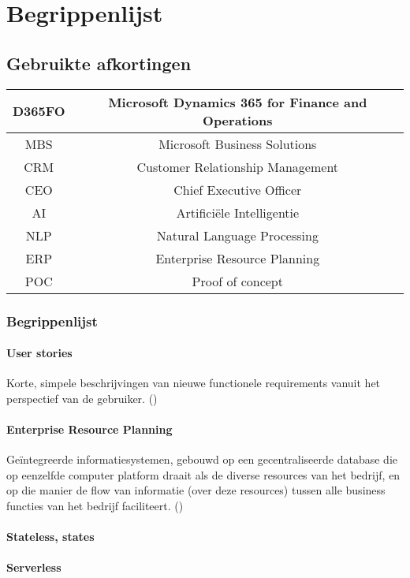 \chapter{Begrippenlijst}
\label{ch:begrippenlijst}

\section{Gebruikte afkortingen}
\begin{tabular}{|c|c|}
    \hline 
    D365FO &  Microsoft Dynamics 365 for Finance and Operations \\
    \hline 
    MBS & Microsoft Business Solutions \\
    \hline
    CRM & Customer Relationship Management  \\
    \hline
    CEO & Chief Executive Officer \\
    \hline
    AI & Artificiële Intelligentie \\
    \hline
    NLP & Natural Language Processing \\
    \hline
    ERP & Enterprise Resource Planning \\
    \hline
    POC & Proof of concept \\
    \hline 
\end{tabular} 

\subsection{Begrippenlijst}
\subsubsection{User stories}
Korte, simpele beschrijvingen van nieuwe functionele requirements vanuit het perspectief van de gebruiker. (\textcite{Cohn2004})

\subsubsection{Enterprise Resource Planning}
Geïntegreerde informatiesystemen, gebouwd op een gecentraliseerde database die op eenzelfde computer platform draait als de diverse resources van het bedrijf, en op die manier de flow van informatie (over deze resources) tussen alle business functies van het bedrijf faciliteert. (\textcite{Hill2011})

\subsubsection{Stateless, states}

\subsubsection{Serverless}




